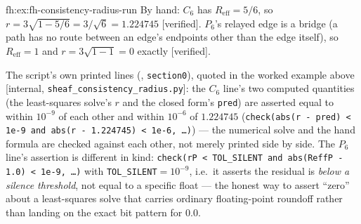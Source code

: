 \begin{pdSolution}{fh:ex:fh-consistency-radius-run}
By hand: $C_6$ has $R_{\mathrm{eff}}=5/6$, so $r=3\sqrt{1-5/6}=3/\sqrt6=1.224745$ [verified]. $P_6$'s relayed edge is a bridge (a path has no route between an edge's endpoints other than the edge itself), so $R_{\mathrm{eff}}=1$ and $r=3\sqrt{1-1}=0$ exactly [verified].

The script's own printed lines (, \texttt{section0}), quoted in the worked example above [internal, \texttt{sheaf\_consistency\_radius.py}]: the $C_6$ line's two computed quantities (the least-squares solve's $r$ and the closed form's \texttt{pred}) are asserted equal to within $10^{-9}$ of each other and within $10^{-6}$ of $1.224745$ (\texttt{check(abs(r - pred) < 1e-9 and abs(r - 1.224745) < 1e-6, \ldots)}) --- the numerical solve and the hand formula are checked against each other, not merely printed side by side. The $P_6$ line's assertion is different in kind: \texttt{check(rP < TOL\_SILENT and abs(ReffP - 1.0) < 1e-9, \ldots)} with \texttt{TOL\_SILENT}$=10^{-9}$, i.e.\ it asserts the residual is \emph{below a silence threshold}, not equal to a specific float --- the honest way to assert ``zero'' about a least-squares solve that carries ordinary floating-point roundoff rather than landing on the exact bit pattern for $0.0$.
\end{pdSolution}
